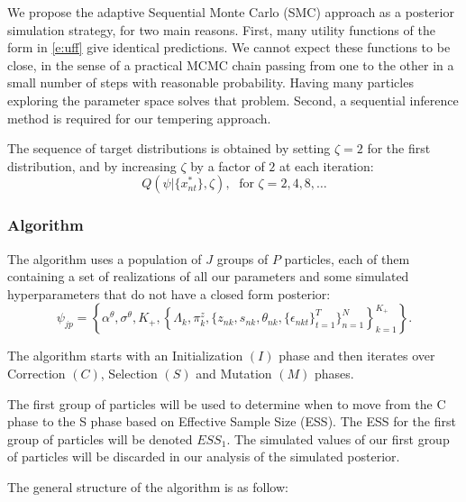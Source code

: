 \documentclass[12pt]{article}
\newcounter{thm}[section]
\begin{document}
We propose the adaptive Sequential Monte Carlo (SMC) approach \citep{DurhamGeweke2013} as a posterior simulation strategy, for two main reasons.
First, many utility functions of the form in \eqref{e:uff} give identical predictions.
We cannot expect these functions to be close, in the sense of a practical MCMC chain passing from one to the other in a small number of steps with reasonable probability. Having many particles exploring the parameter space solves that problem.
Second, a sequential inference method is required for our tempering approach.

The sequence of target distributions is obtained by setting $\zeta=2$ for the first distribution, and by increasing $\zeta$ by a factor of $2$ at each iteration:
$$ Q(\psi|\{x_{nt}^*\},\zeta), \; \text{ for } \zeta=2,4,8,\ldots $$ 


\subsubsection{Algorithm}

The algorithm uses a population of $J$ groups of $P$ particles, each of them containing a set of realizations of all our parameters and some simulated hyperparameters that do not have a closed form posterior: $$\psi_{jp} = \left\{\alpha^\theta, \sigma^\theta, K_+,\left\{\Lambda_k, \pi^z_k, \{z_{nk},s_{nk},\theta_{nk},\{\epsilon_{nkt}\}_{t=1}^T \}_{n=1}^N \right\}_{k=1}^{K_+} \right\}.$$

The algorithm starts with an Initialization $(I)$ phase and then iterates over Correction $(C)$, Selection $(S)$ and Mutation $(M)$ phases. 

The first group of particles will be used to determine when to move from the C phase to the S phase based on Effective Sample Size (ESS). The ESS for the first group of particles will be denoted $ESS_1$. The simulated values of our first group of particles will be discarded in our analysis of the simulated posterior.  

The general structure of the algorithm is as follow:
\end{document}
